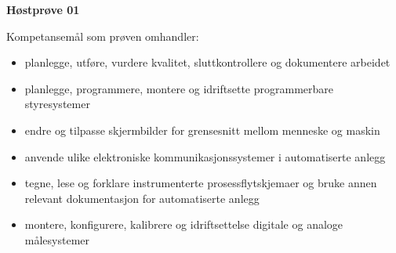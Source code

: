 
\begin{centering}
\Huge{\textbf{Høstprøve 01}}\\
\end{centering}
\vskip 2cm 
Kompetansemål som prøven omhandler:
\begin{itemize}
	\item planlegge, utføre, vurdere kvalitet, sluttkontrollere og dokumentere arbeidet
	\item planlegge, programmere, montere og idriftsette programmerbare styresystemer
	\item endre og tilpasse skjermbilder for grensesnitt mellom menneske og maskin
	\item anvende ulike elektroniske kommunikasjonssystemer i automatiserte anlegg
	\item tegne, lese og forklare instrumenterte prosessflytskjemaer og bruke annen relevant dokumentasjon for automatiserte anlegg
	\item montere, konfigurere, kalibrere og idriftsettelse digitale og analoge målesystemer
\end{itemize}

